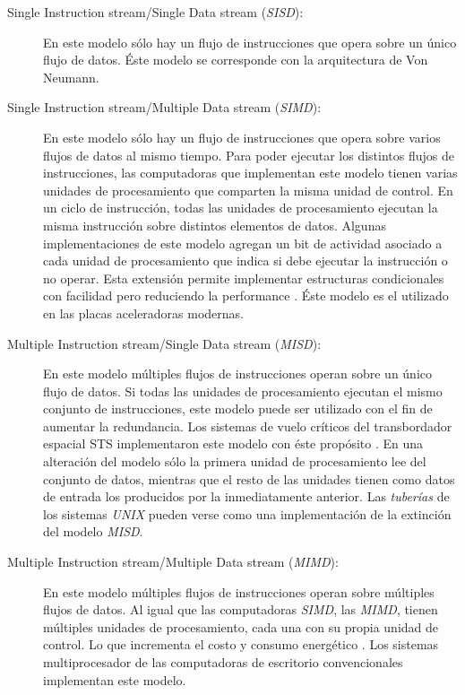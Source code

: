\begin{description}

	\item[Single Instruction stream/Single Data stream (\emph{SISD}):] En
		este modelo sólo hay un flujo de instrucciones que opera sobre
		un único flujo de datos. Éste modelo se corresponde con la
		arquitectura de Von Neumann.

	\item[Single Instruction stream/Multiple Data stream (\emph{SIMD}):] En
		este modelo sólo hay un flujo de instrucciones que opera sobre
		varios flujos de datos al mismo tiempo. Para poder ejecutar los
		distintos flujos de instrucciones, las computadoras que
		implementan este modelo tienen varias unidades de procesamiento
		que comparten la misma unidad de control. En un ciclo de
		instrucción, todas las unidades de procesamiento ejecutan la
		misma instrucción sobre distintos elementos de datos. Algunas
		implementaciones de este modelo agregan un bit de actividad
		asociado a cada unidad de procesamiento que indica si debe
		ejecutar la instrucción o no operar. Esta extensión permite
		implementar estructuras condicionales con facilidad pero
		reduciendo la performance \cite{introToPC2002}. Éste modelo es
		el utilizado en las placas aceleradoras modernas.

	\item[Multiple Instruction stream/Single Data stream (\emph{MISD}):] En
		este modelo múltiples flujos de instrucciones operan sobre un
		único flujo de datos. Si todas las unidades de procesamiento
		ejecutan el mismo conjunto de instrucciones, este modelo puede
		ser utilizado con el fin de aumentar la redundancia. Los
		sistemas de vuelo críticos del transbordador espacial STS
		implementaron este modelo con éste propósito
		\cite{spaceShuttlePCS1984}. En una alteración del modelo sólo la
		primera unidad de procesamiento lee del conjunto de datos,
		mientras que el resto de las unidades tienen como datos de
		entrada los producidos por la inmediatamente anterior. Las
		\emph{tuberías} de los sistemas \emph{UNIX} pueden verse como
		una implementación de la extinción del modelo \emph{MISD}.

	\item[Multiple Instruction stream/Multiple Data stream (\emph{MIMD}):] En
		este modelo múltiples flujos de instrucciones operan sobre
		múltiples flujos de datos. Al igual que las computadoras
		\emph{SIMD}, las \emph{MIMD}, tienen múltiples unidades de
		procesamiento, cada una con su propia unidad de control.
		Lo que incrementa el costo y consumo energético
		\cite{introToPC2002}. Los sistemas multiprocesador de las
		computadoras de escritorio convencionales implementan este
		modelo.

\end{description}

